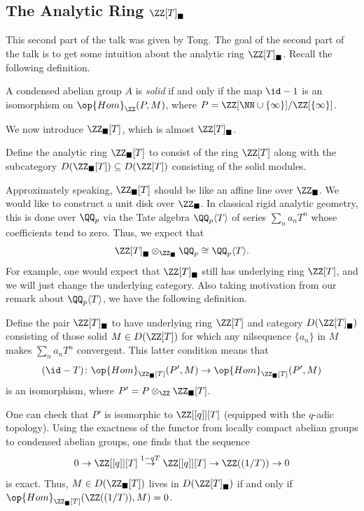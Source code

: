 \documentclass{article}
\begin{document}
\subsection{The Analytic Ring \texorpdfstring{$\ZZ[T]_\blacksquare$}{ Z[T] box}}
This second part of the talk was given by Tong. The goal of the second part of the talk is to get some intuition about the analytic ring $\ZZ[T]_\blacksquare$. Recall the following definition.
\begin{definition}
	A condensed abelian group $A$ is \textit{solid} if and only if the map ${\id}-1$ is an isomorphism on $\op{Hom}_\ZZ(P,M)$, where $P=\ZZ[\NN\cup\{\infty\}]/\ZZ[\{\infty\}]$.
\end{definition}
We now introduce $\ZZ_\blacksquare[T]$, which is almost $\ZZ[T]_\blacksquare$.
\begin{notation}
	Define the analytic ring $\ZZ_\blacksquare[T]$ to consist of the ring $\ZZ[T]$ along with the subcategory $D(\ZZ_\blacksquare[T])\subseteq D(\ZZ[T])$ consisting of the solid modules.
\end{notation}
Approximately speaking, $\ZZ_\blacksquare[T]$ should be like an affine line over $\ZZ_\blacksquare$. We would like to construct a unit disk over $\ZZ_\blacksquare$. In classical rigid analytic geometry, this is done over $\QQ_p$ via the Tate algebra $\QQ_p\langle T\rangle$ of series $\sum_na_nT^n$ whose coefficients tend to zero. Thus, we expect that
\[\ZZ[T]_\blacksquare\otimes_{\ZZ_\blacksquare}\QQ_p\cong\QQ_p\langle T\rangle.\]
For example, one would expect that $\ZZ[T]_\blacksquare$ still has underlying ring $\ZZ[T]$, and we will just change the underlying category. Also taking motivation from our remark about $\QQ_p\langle T\rangle$, we have the following definition.
\begin{definition}
	Define the pair $\ZZ[T]_\blacksquare$ to have underlying ring $\ZZ[T]$ and category $D(\ZZ[T]_\blacksquare)$ consisting of those solid $M\in D(\ZZ[T])$ for which any nilsequence $\{a_n\}$ in $M$ makes $\sum_na_nT^n$ convergent. This latter condition means that
	\[({\id}-T)\colon\op{Hom}_{\ZZ_\blacksquare[T]}(P',M)\to\op{Hom}_{\ZZ_\blacksquare[T]}(P',M)\]
	is an isomorphism, where $P'=P\otimes_\ZZ\ZZ_\blacksquare[T]$.
\end{definition}
\begin{remark}
	One can check that $P'$ is isomorphic to $\ZZ[[q]][T]$ (equipped with the $q$-adic topology). Using the exactness of the functor from locally compact abelian groups to condensed abelian groups, one finds that the sequence
	\[0\to\ZZ[[q]][T]\stackrel{1-qT}\to\ZZ[[q]][T]\to\ZZ((1/T))\to0\]
	is exact. Thus, $M\in D(\ZZ_\blacksquare[T])$ lives in $D(\ZZ[T]_\blacksquare)$ if and only if $\op{Hom}_{\ZZ_\blacksquare[T]}(\ZZ((1/T)),M)=0$.
\end{remark}
\end{document}
